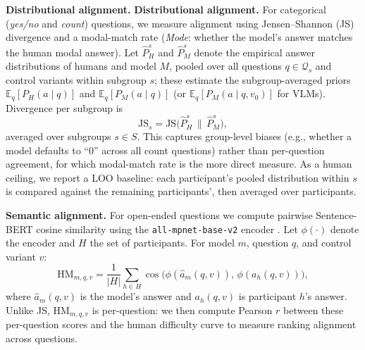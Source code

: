 \documentclass[letterpaper]{article}
\begin{document}
\textbf{Distributional alignment.} 
\textbf{Distributional alignment.} For categorical (\textit{yes/no} and \textit{count}) questions, we measure alignment using Jensen--Shannon (JS) divergence and a modal-match rate (\textit{Mode}: whether the model's answer matches the human modal answer).
Let $\hat{P}_{H}^{s}$ and $\hat{P}_{M}^{s}$ denote the empirical answer distributions of humans and model $M$, pooled over all questions $q\!\in\!\mathcal{Q}_{s}$ and control variants within subgroup $s$; these estimate the subgroup-averaged priors $\mathbb{E}_{q}[P_{H}(a\mid q)]$ and $\mathbb{E}_{q}[P_{M}(a\mid q)]$ (or $\mathbb{E}_{q}[P_{M}(a\mid q,v_{0})]$ for VLMs).
Divergence per subgroup is
\begin{equation}
  \mathrm{JS}_{s} = \mathrm{JS}\!\bigl(\hat{P}_{H}^{s} \,\|\, \hat{P}_{M}^{s}\bigr),
  \label{eq:js}
\end{equation}
averaged over subgroups $s\!\in\!S$.
This captures group-level biases (e.g., whether a model defaults to ``0'' across all count questions) rather than per-question agreement, for which modal-match rate is the more direct measure.
As a human ceiling, we report a LOO baseline: each participant's pooled distribution within $s$ is compared against the remaining participants', then averaged over participants.


\textbf{Semantic alignment.} For open-ended questions we compute pairwise Sentence-BERT \citep{reimers2019sentence} cosine similarity using the \texttt{all-mpnet-base-v2} encoder \citep{song2020mpnet}.
Let $\phi(\cdot)$ denote the encoder and $H$ the set of participants.
For model $m$, question $q$, and control variant $v$:
\begin{equation}
  \mathrm{HM}_{m,q,v} = \frac{1}{|H|}\sum_{h\in H}\cos\!\bigl(\phi(\hat{a}_{m}(q,v)),\,\phi(a_{h}(q,v))\bigr),
  \label{eq:sbert}
\end{equation}
where $\hat{a}_{m}(q,v)$ is the model's answer and $a_{h}(q,v)$ is participant $h$'s answer.
Unlike JS, $\mathrm{HM}_{m,q,v}$ is per-question: we then compute Pearson $r$ between these per-question scores and the human difficulty curve to measure ranking alignment across questions.
\end{document}
